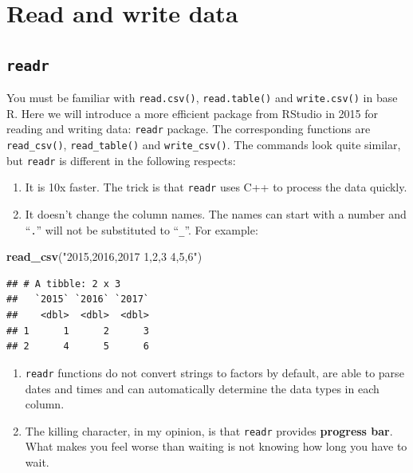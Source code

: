 \documentclass[12pt,]{krantz}
\makeatletter
\newenvironment{Shaded}{\begin{snugshade}}{\end{snugshade}}
\newcommand{\KeywordTok}[1]{\textcolor[rgb]{0.27,0.27,0.27}{\textbf{#1}}}
\newcommand{\NormalTok}[1]{#1}
\newcommand{\StringTok}[1]{\textcolor[rgb]{0.5,0.5,0.5}{#1}}
\newenvironment{kframe}{%
\medskip{}
\setlength{\fboxsep}{.8em}
 \def\at@end@of@kframe{}%
 \ifinner\ifhmode%
  \def\at@end@of@kframe{\end{minipage}}%
  \begin{minipage}{\columnwidth}%
 \fi\fi%
 \def\FrameCommand##1{\hskip\@totalleftmargin \hskip-\fboxsep
 \colorbox{shadecolor}{##1}\hskip-\fboxsep
     \hskip-\linewidth \hskip-\@totalleftmargin \hskip\columnwidth}%
 \MakeFramed {\advance\hsize-\width
   \@totalleftmargin\z@ \linewidth\hsize
   \@setminipage}}%
 {\par\unskip\endMakeFramed%
 \at@end@of@kframe}
\renewenvironment{Shaded}{\begin{kframe}}{\end{kframe}}
\makeatother
\begin{document}
\hypertarget{read-and-write-data}{%
\section{Read and write data}\label{read-and-write-data}}

\hypertarget{readr}{%
\subsection{\texorpdfstring{\texttt{readr}}{readr}}\label{readr}}

You must be familiar with \texttt{read.csv()}, \texttt{read.table()} and \texttt{write.csv()} in base R. Here we will introduce a more efficient package from RStudio in 2015 for reading and writing data: \texttt{readr} package. The corresponding functions are \texttt{read\_csv()}, \texttt{read\_table()} and \texttt{write\_csv()}. The commands look quite similar, but \texttt{readr} is different in the following respects:

\begin{enumerate}
\def\labelenumi{\arabic{enumi}.}
\item
  It is 10x faster. The trick is that \texttt{readr} uses C++ to process the data quickly.
\item
  It doesn't change the column names. The names can start with a number and ``\texttt{.}'' will not be substituted to ``\texttt{\_}''. For example:
\end{enumerate}

\begin{Shaded}
\begin{Highlighting}[]
\KeywordTok{read_csv}\NormalTok{(}\StringTok{"2015,2016,2017}
\StringTok{1,2,3}
\StringTok{4,5,6"}\NormalTok{)}
\end{Highlighting}
\end{Shaded}

\begin{verbatim}
## # A tibble: 2 x 3
##   `2015` `2016` `2017`
##    <dbl>  <dbl>  <dbl>
## 1      1      2      3
## 2      4      5      6
\end{verbatim}

\begin{enumerate}
\def\labelenumi{\arabic{enumi}.}
\item
  \texttt{readr} functions do not convert strings to factors by default, are able to parse dates and times and can automatically determine the data types in each column.
\item
  The killing character, in my opinion, is that \texttt{readr} provides \textbf{progress bar}. What makes you feel worse than waiting is not knowing how long you have to wait.
\end{enumerate}
\end{document}
